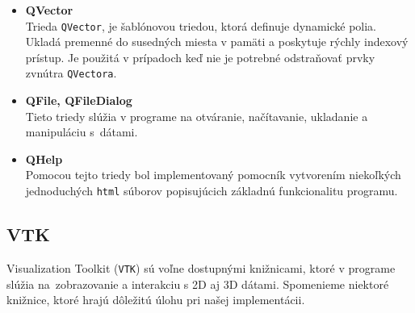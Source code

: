 \documentclass[a4paper,11pt,oneside]{article}%
\begin{document}
\begin{itemize}
\item \textbf{QVector} \\
Trieda \texttt{QVector}, je šablónovou triedou, ktorá definuje dynamické polia. Ukladá premenné do susedných miesta v pamäti a poskytuje rýchly indexový prístup. Je použitá v prípadoch keď nie je potrebné odstraňovať prvky zvnútra \texttt{QVectora}.

\item \textbf{QFile, QFileDialog} \\
Tieto triedy slúžia v programe na otváranie, načítavanie, ukladanie a manipuláciu s~dátami.

\item \textbf{QHelp} \\
Pomocou tejto triedy bol implementovaný pomocník vytvorením niekoľkých jednoduchých \texttt{html} súborov popisujúcich základnú funkcionalitu programu.

\end{itemize}

\subsection{VTK}

Visualization Toolkit (\texttt{VTK}) sú voľne dostupnými knižnicami, ktoré v programe slúžia na~zobrazovanie a interakciu s 2D aj 3D dátami. Spomenieme niektoré knižnice, ktoré hrajú dôležitú úlohu pri našej implementácii.
\end{document}
